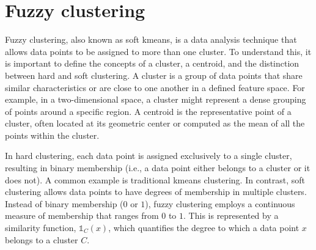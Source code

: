 \section{Fuzzy clustering}
Fuzzy clustering, also known as soft \gls{kmeans}, is a data analysis technique that allows data points to be assigned to more than one cluster. To understand this, it is important to define the concepts of a cluster, a centroid, and the distinction between hard and soft clustering. A cluster is a group of data points that share similar characteristics or are close to one another in a defined feature space. For example, in a two-dimensional space, a cluster might represent a dense grouping of points around a specific region. A centroid is the representative point of a cluster, often located at its geometric center or computed as the mean of all the points within the cluster.

\noindent In hard clustering, each data point is assigned exclusively to a single cluster, resulting in binary membership (i.e., a data point either belongs to a cluster or it does not). A common example is traditional \gls{kmeans} clustering. In contrast, soft clustering allows data points to have degrees of membership in multiple clusters. Instead of binary membership ($0$ or $1$), fuzzy clustering employs a continuous measure of membership that ranges from $0$ to $1$. This is represented by a similarity function, $\mathds{1}_C(x)$, which quantifies the degree to which a data point $x$ belongs to a cluster $C$.



